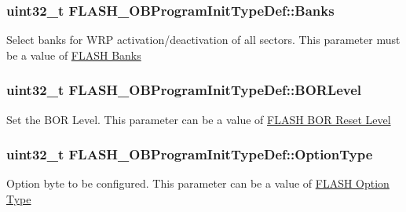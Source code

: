 \subsubsection[{\texorpdfstring{Banks}{Banks}}]{\setlength{\rightskip}{0pt plus 5cm}uint32\+\_\+t F\+L\+A\+S\+H\+\_\+\+O\+B\+Program\+Init\+Type\+Def\+::\+Banks}\hypertarget{struct_f_l_a_s_h___o_b_program_init_type_def_a5fdf437b5f79d79945f5c0777f76d0eb}{}\label{struct_f_l_a_s_h___o_b_program_init_type_def_a5fdf437b5f79d79945f5c0777f76d0eb}
Select banks for W\+RP activation/deactivation of all sectors. This parameter must be a value of \hyperlink{group___f_l_a_s_h_ex___banks}{F\+L\+A\+SH Banks} 
\subsubsection[{\texorpdfstring{B\+O\+R\+Level}{BORLevel}}]{\setlength{\rightskip}{0pt plus 5cm}uint32\+\_\+t F\+L\+A\+S\+H\+\_\+\+O\+B\+Program\+Init\+Type\+Def\+::\+B\+O\+R\+Level}\hypertarget{struct_f_l_a_s_h___o_b_program_init_type_def_a51a6af507ed8f57590f19b6ba6c9c33d}{}\label{struct_f_l_a_s_h___o_b_program_init_type_def_a51a6af507ed8f57590f19b6ba6c9c33d}
Set the B\+OR Level. This parameter can be a value of \hyperlink{group___f_l_a_s_h_ex___b_o_r___reset___level}{F\+L\+A\+SH B\+OR Reset Level} 
\subsubsection[{\texorpdfstring{Option\+Type}{OptionType}}]{\setlength{\rightskip}{0pt plus 5cm}uint32\+\_\+t F\+L\+A\+S\+H\+\_\+\+O\+B\+Program\+Init\+Type\+Def\+::\+Option\+Type}\hypertarget{struct_f_l_a_s_h___o_b_program_init_type_def_a46bffc2a63ea02e15b9187856535d890}{}\label{struct_f_l_a_s_h___o_b_program_init_type_def_a46bffc2a63ea02e15b9187856535d890}
Option byte to be configured. This parameter can be a value of \hyperlink{group___f_l_a_s_h_ex___option___type}{F\+L\+A\+SH Option Type} 
